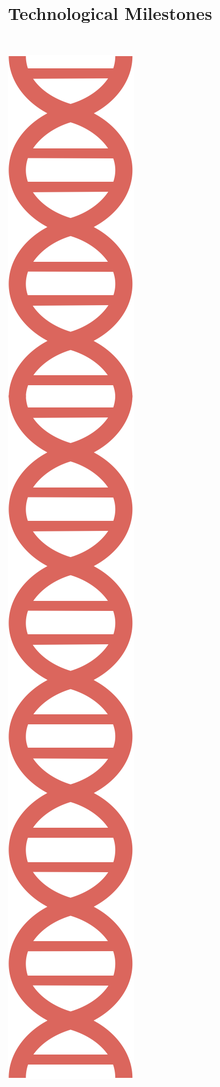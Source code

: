 \documentclass{beamer}
\begin{document}
\begin{frame}
	
	\frametitle{Technological Milestones}
	
	\begin{columns}
		\begin{column}{0.1\textwidth}
			\includegraphics[keepaspectratio, width  =\textwidth]{img/dnaCartoon}

\end{column}
\end{columns}
\end{frame}
\end{document}
